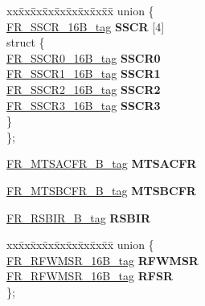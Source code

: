 \begin{DoxyCompactItemize}
\begin{tabbing}
\end{tabbing}\item 
\mbox{\label{structFR__struct__tag_a5ebae7de1cf0490f64bed8e6c57dfd23}} 
\begin{tabbing}
xx\=xx\=xx\=xx\=xx\=xx\=xx\=xx\=xx\=\kill
union \{\\
\>\mbox{\hyperlink{unionFR__SSCR__16B__tag}{FR\_SSCR\_16B\_tag}} {\bfseries SSCR} \mbox{[}4\mbox{]}\\
\mbox{\label{unionFR__struct__tag_1_1_0D2506_adf66fa63331caaf59d56158b2151b812}} 
\>struct \{\\
\>\>\mbox{\hyperlink{unionFR__SSCR0__16B__tag}{FR\_SSCR0\_16B\_tag}} {\bfseries SSCR0}\\
\>\>\mbox{\hyperlink{unionFR__SSCR1__16B__tag}{FR\_SSCR1\_16B\_tag}} {\bfseries SSCR1}\\
\>\>\mbox{\hyperlink{unionFR__SSCR2__16B__tag}{FR\_SSCR2\_16B\_tag}} {\bfseries SSCR2}\\
\>\>\mbox{\hyperlink{unionFR__SSCR3__16B__tag}{FR\_SSCR3\_16B\_tag}} {\bfseries SSCR3}\\
\>\} \\
\}; \\

\end{tabbing}\item 
\mbox{\label{structFR__struct__tag_a95428013c9c0af458841f7abc1a9105f}} 
\mbox{\hyperlink{unionFR__MTSACFR__16B__tag}{F\+R\+\_\+\+M\+T\+S\+A\+C\+F\+R\+\_\+B\+\_\+tag}} {\bfseries M\+T\+S\+A\+C\+FR}
\item 
\mbox{\label{structFR__struct__tag_a3676911557c55230d0c9dbdc9ee47757}} 
\mbox{\hyperlink{unionFR__MTSBCFR__16B__tag}{F\+R\+\_\+\+M\+T\+S\+B\+C\+F\+R\+\_\+B\+\_\+tag}} {\bfseries M\+T\+S\+B\+C\+FR}
\item 
\mbox{\label{structFR__struct__tag_a405a9d6b6a96745feaf915926704f6be}} 
\mbox{\hyperlink{unionFR__RSBIR__16B__tag}{F\+R\+\_\+\+R\+S\+B\+I\+R\+\_\+B\+\_\+tag}} {\bfseries R\+S\+B\+IR}
\item 
\mbox{\label{structFR__struct__tag_a454f28a62bbe23c18048de1dfc54d321}} 
\begin{tabbing}
xx\=xx\=xx\=xx\=xx\=xx\=xx\=xx\=xx\=\kill
union \{\\
\>\mbox{\hyperlink{unionFR__RFWMSR__16B__tag}{FR\_RFWMSR\_16B\_tag}} {\bfseries RFWMSR}\\
\>\mbox{\hyperlink{unionFR__RFWMSR__16B__tag}{FR\_RFWMSR\_16B\_tag}} {\bfseries RFSR}\\
\}; \\


\end{tabbing}
\end{DoxyCompactItemize}
